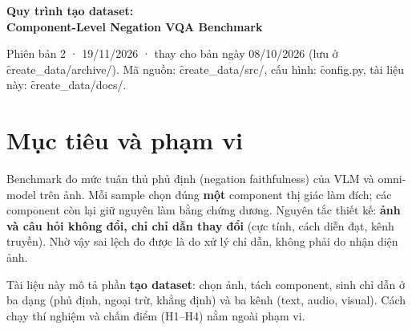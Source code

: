 \documentclass[10.5pt]{article}
\begin{document}
\sloppy

{\LARGE\bfseries\color{headblue} Quy trình tạo dataset:\\[2pt] Component-Level Negation VQA Benchmark}

\vspace{4pt}
{\small Phiên bản 2 · 19/11/2026 · thay cho bản ngày 08/10/2026 (lưu ở \f{create\_data/archive/}).
Mã nguồn: \f{create\_data/src/}, cấu hình: \f{config.py}, tài liệu này: \f{create\_data/docs/}.}

\vspace{6pt}

\section{Mục tiêu và phạm vi}
Benchmark đo mức tuân thủ phủ định (negation faithfulness) của VLM và omni-model trên ảnh. Mỗi sample chọn
đúng \textbf{một} component thị giác làm đích; các component còn lại giữ nguyên làm bằng chứng dương.
Nguyên tắc thiết kế: \textbf{ảnh và câu hỏi không đổi, chỉ chỉ dẫn thay đổi} (cực tính, cách diễn đạt, kênh
truyền). Nhờ vậy sai lệch đo được là do xử lý chỉ dẫn, không phải do nhận diện ảnh.

Tài liệu này mô tả phần \textbf{tạo dataset}: chọn ảnh, tách component, sinh chỉ dẫn ở ba dạng
(phủ định, ngoại trừ, khẳng định) và ba kênh (text, audio, visual). Cách chạy thí nghiệm và chấm điểm
(H1--H4) nằm ngoài phạm vi.
\end{document}
